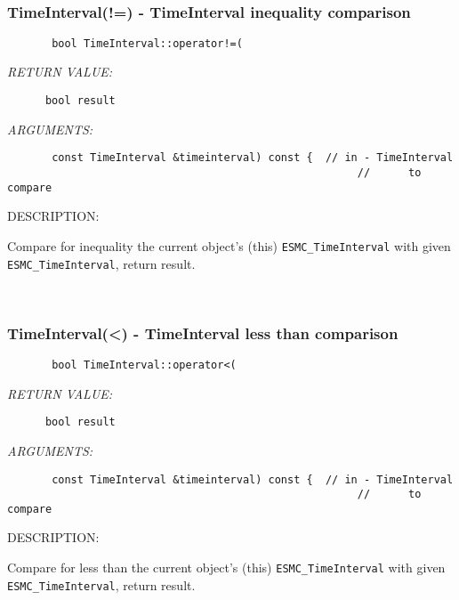 \mbox{}\hrulefill\ 
 
\subsubsection [TimeInterval(!=)] {TimeInterval(!=) - TimeInterval inequality comparison}


  
\begin{verbatim}       bool TimeInterval::operator!=(\end{verbatim}{\em RETURN VALUE:}
\begin{verbatim}      bool result\end{verbatim}{\em ARGUMENTS:}
\begin{verbatim}       const TimeInterval &timeinterval) const {  // in - TimeInterval
                                                       //      to compare\end{verbatim}
{\sf DESCRIPTION:\\ }


        Compare for inequality the current object's (this)
        {\tt ESMC\_TimeInterval} with given {\tt ESMC\_TimeInterval},
        return result.
   
 
\mbox{}\hrulefill\ 
 
\subsubsection [TimeInterval(<)] {TimeInterval(<) - TimeInterval less than comparison}


  
\begin{verbatim}       bool TimeInterval::operator<(\end{verbatim}{\em RETURN VALUE:}
\begin{verbatim}      bool result\end{verbatim}{\em ARGUMENTS:}
\begin{verbatim}       const TimeInterval &timeinterval) const {  // in - TimeInterval
                                                       //      to compare\end{verbatim}
{\sf DESCRIPTION:\\ }


        Compare for less than the current object's (this)
        {\tt ESMC\_TimeInterval} with given {\tt ESMC\_TimeInterval},
        return result.
   
